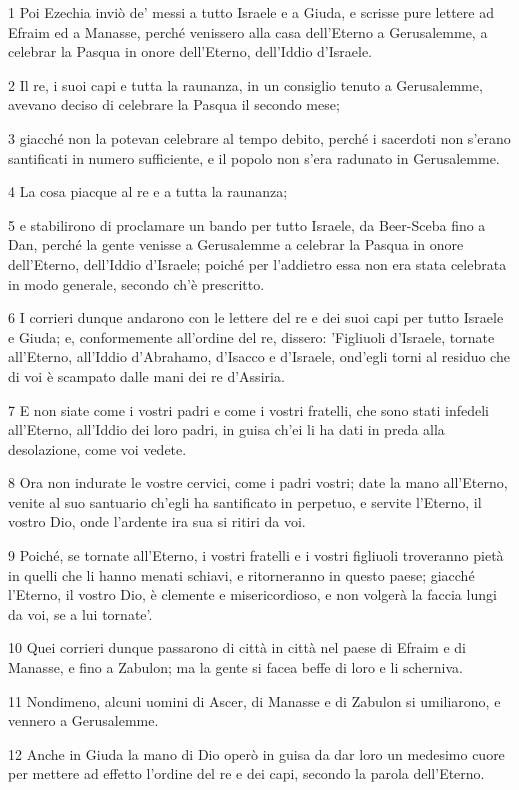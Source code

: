 \par 1 Poi Ezechia inviò de' messi a tutto Israele e a Giuda, e scrisse pure lettere ad Efraim ed a Manasse, perché venissero alla casa dell'Eterno a Gerusalemme, a celebrar la Pasqua in onore dell'Eterno, dell'Iddio d'Israele.
\par 2 Il re, i suoi capi e tutta la raunanza, in un consiglio tenuto a Gerusalemme, avevano deciso di celebrare la Pasqua il secondo mese;
\par 3 giacché non la potevan celebrare al tempo debito, perché i sacerdoti non s'erano santificati in numero sufficiente, e il popolo non s'era radunato in Gerusalemme.
\par 4 La cosa piacque al re e a tutta la raunanza;
\par 5 e stabilirono di proclamare un bando per tutto Israele, da Beer-Sceba fino a Dan, perché la gente venisse a Gerusalemme a celebrar la Pasqua in onore dell'Eterno, dell'Iddio d'Israele; poiché per l'addietro essa non era stata celebrata in modo generale, secondo ch'è prescritto.
\par 6 I corrieri dunque andarono con le lettere del re e dei suoi capi per tutto Israele e Giuda; e, conformemente all'ordine del re, dissero: 'Figliuoli d'Israele, tornate all'Eterno, all'Iddio d'Abrahamo, d'Isacco e d'Israele, ond'egli torni al residuo che di voi è scampato dalle mani dei re d'Assiria.
\par 7 E non siate come i vostri padri e come i vostri fratelli, che sono stati infedeli all'Eterno, all'Iddio dei loro padri, in guisa ch'ei li ha dati in preda alla desolazione, come voi vedete.
\par 8 Ora non indurate le vostre cervici, come i padri vostri; date la mano all'Eterno, venite al suo santuario ch'egli ha santificato in perpetuo, e servite l'Eterno, il vostro Dio, onde l'ardente ira sua si ritiri da voi.
\par 9 Poiché, se tornate all'Eterno, i vostri fratelli e i vostri figliuoli troveranno pietà in quelli che li hanno menati schiavi, e ritorneranno in questo paese; giacché l'Eterno, il vostro Dio, è clemente e misericordioso, e non volgerà la faccia lungi da voi, se a lui tornate'.
\par 10 Quei corrieri dunque passarono di città in città nel paese di Efraim e di Manasse, e fino a Zabulon; ma la gente si facea beffe di loro e li scherniva.
\par 11 Nondimeno, alcuni uomini di Ascer, di Manasse e di Zabulon si umiliarono, e vennero a Gerusalemme.
\par 12 Anche in Giuda la mano di Dio operò in guisa da dar loro un medesimo cuore per mettere ad effetto l'ordine del re e dei capi, secondo la parola dell'Eterno.
